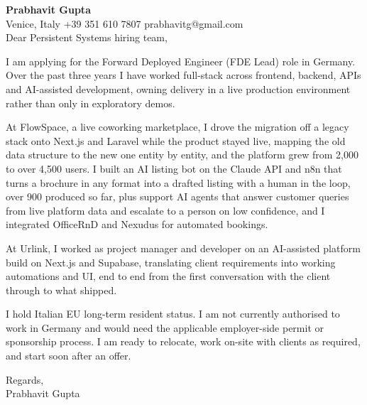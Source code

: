 \documentclass[a4paper,10.5pt]{article}
\begin{document}
\textbf{Prabhavit Gupta}\\
Venice, Italy \textbar{} +39 351 610 7807 \textbar{} prabhavitg@gmail.com\\[10pt]
Dear Persistent Systems hiring team,

I am applying for the Forward Deployed Engineer (FDE Lead) role in Germany. Over the past three years I have worked full-stack across frontend, backend, APIs and AI-assisted development, owning delivery in a live production environment rather than only in exploratory demos.

At FlowSpace, a live coworking marketplace, I drove the migration off a legacy stack onto Next.js and Laravel while the product stayed live, mapping the old data structure to the new one entity by entity, and the platform grew from 2,000 to over 4,500 users. I built an AI listing bot on the Claude API and n8n that turns a brochure in any format into a drafted listing with a human in the loop, over 900 produced so far, plus support AI agents that answer customer queries from live platform data and escalate to a person on low confidence, and I integrated OfficeRnD and Nexudus for automated bookings.

At Urlink, I worked as project manager and developer on an AI-assisted platform build on Next.js and Supabase, translating client requirements into working automations and UI, end to end from the first conversation with the client through to what shipped.

I hold Italian EU long-term resident status. I am not currently authorised to work in Germany and would need the applicable employer-side permit or sponsorship process. I am ready to relocate, work on-site with clients as required, and start soon after an offer.

Regards,\\
Prabhavit Gupta
\end{document}
